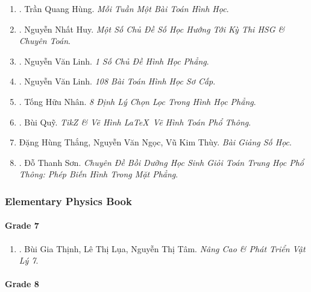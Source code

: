 \documentclass{article}
\begin{document}
\begin{enumerate}
	\item \cite{Hung_weekly_geometry}. {\sc Trần Quang Hùng}. {\it Mỗi Tuần Một Bài Toán Hình Học}.\hfill{\sf[reading]}
	
	\item \cite{Huy_so_hoc}. Nguyễn Nhất Huy. {\it Một Số Chủ Đề Số Học Hướng Tới Kỳ Thi HSG \& Chuyên Toán}.\hfill{\sf[reading]}
	
	\item \cite{Linh_topic_geometry}. Nguyễn Văn Linh. {\it 1 Số Chủ Đề Hình Học Phẳng}.\hfill{\sf[reading]}
	
	\item \cite{Linh_108_geometry}. Nguyễn Văn Linh. {\it 108 Bài Toán Hình Học Sơ Cấp}.\hfill{\sf[reading]}
	
	\item \cite{Nhan_8_geometry_theorem}. Tống Hữu Nhân. {\it 8 Định Lý Chọn Lọc Trong Hình Học Phẳng}.\hfill{\sf[reading]}
	
	\item \cite{Quy2022}. Bùi Quỹ. {\it TikZ \& Vẽ Hình \LaTeX\ Vẽ Hình Toán Phổ Thông}.\hfill{\sf[reading]}
	
	\item Đặng Hùng Thắng, Nguyễn Văn Ngọc, Vũ Kim Thùy. {\it Bài Giảng Số Học}.
	
	\item \cite{Son2006}. Đỗ Thanh Sơn. {\it Chuyên Đề Bồi Dưỡng Học Sinh Giỏi Toán Trung Học Phổ Thông: Phép Biến Hình Trong Mặt Phẳng}.\hfill{\sf[reading]}	
\end{enumerate}

\subsubsection{Elementary Physics Book}

\paragraph{Grade 7}

\begin{enumerate}
	\item \cite{Thinh_Lua_ncpt_Vat_Ly_7}. Bùi Gia Thịnh, Lê Thị Lụa, Nguyễn Thị Tâm. {\it Nâng Cao \& Phát Triển Vật Lý 7}.\hfill{\sf[reading]}
\end{enumerate}

\paragraph{Grade 8}
\end{document}
